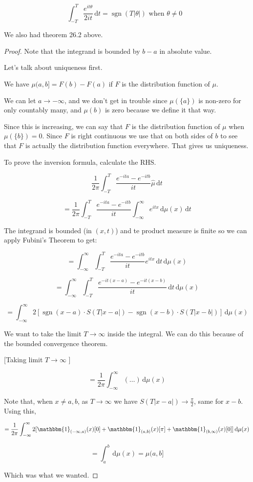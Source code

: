 \documentclass{article}
\theoremstyle{definition}
\begin{document}
\[
    \int_{-T}^{T} \frac{e^{it \theta} }{2it} \,\mathrm{d}t = \operatorname{sgn}(T \vert \theta  \vert ) \text{ when \(\theta \neq 0\) } 
\]

We also had theorem 26.2 above.

\begin{proof}
    Note that the integrand is bounded by \(b-a\) in absolute value.

    Let's talk about uniqueness first.

    We have \(\mu (a,b] = F(b) - F(a)\) if \(F\) is the distribution function of \(\mu \).

    We can let \(a \to -\infty\), and we don't get in trouble since \(\mu (\{ a \} )\) is non-zero for only countably many, and \(\mu (b)\) is zero because we define it that way.

    Since this is increasing, we can say that \(F\) is the distribution function of \(\mu \) when \(\mu (\{ b \} ) = 0\). Since \(F\) is right continuous we use that on both sides of \(b\) to see that \(F\) is actually the distribution function everywhere. That gives us uniqueness.
    
    To prove the inversion formula, calculate the RHS.

    \[
        \frac{1}{2\pi} \int_{-T}^{T} \frac{e^{-ita} - e^{-itb}}{it}\hat{\mu} \,\mathrm{d}t 
    \]

    \[
        =\frac{1}{2\pi} \int_{-T}^{T} \frac{e^{-ita} - e^{-itb}}{it}\int_{-\infty}^{\infty} e^{itx} \,\mathrm{d}\mu(x)  \,\mathrm{d}t 
    \]

    The integrand is bounded (in \((x,t)\)) and te product measure is finite so we can apply Fubini's Theorem to get:

    \[
        =\int_{-\infty}^{\infty} \int_{-T}^{T} \frac{e^{-ita} - e^{-itb}}{it}e^{itx} \,\mathrm{d}t  \,\mathrm{d}\mu(x) 
    \]

    \[
        =\int_{-\infty}^{\infty} \int_{-T}^{T} \frac{e^{-it(x-a)} - e^{-it(x-b)}}{it} \,\mathrm{d}t \,\mathrm{d}\mu(x)
    \]

    \[
        =\int_{-\infty}^{\infty} 2 [\operatorname{sgn}(x-a)\cdot S(T \vert x-a \vert )-\operatorname{sgn}(x-b)\cdot S(T \vert x-b \vert )] \,\mathrm{d}\mu(x)
    \]

    We want to take the limit \(T \to \infty\) inside the integral. We can do this because of the bounded convergence theorem.

    [Taking limit \(T \to \infty\) ]

    \[
        = \frac{1}{2\pi} \int_{-\infty}^{\infty} (\dots) \,\mathrm{d}\mu (x) 
    \]

    Note that, when \(x \neq a,b\), as \(T \to \infty\) we have \(S(T\vert x-a \vert )\to \frac{\pi}{2}\), same for \(x-b\). Using this, 

    \[
        = \frac{1}{2\pi} \int_{-\infty}^{\infty} 2[\mathbbm{1}_{(-\infty,a)}(x)[0] + \mathbbm{1}_{(a,b)}(x)[\pi] + \mathbbm{1}_{(b,\infty)}(x)[0] ] \,\mathrm{d}\mu (x)  
    \]

    \[
        = \int_{a}^{b} \,\mathrm{d}\mu (x) = \mu (a,b]
    \]

    Which was what we wanted.

\end{proof}
\end{document}
